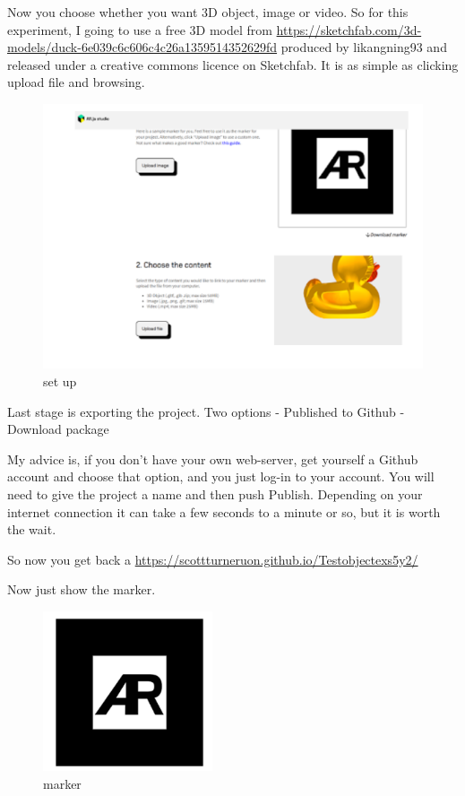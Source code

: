Now you choose whether you want 3D object, image or video. So for this experiment, I going to use a free 3D model from \url{https://sketchfab.com/3d-models/duck-6e039c6c606c4c26a1359514352629fd} produced by likangning93 and released under a creative commons licence on Sketchfab. It is as simple as clicking upload file and browsing.

\begin{figure}
    \centering
    \includegraphics{chapters/ChapterAR/webar5.png}
    \caption{set up}
    \label{fig:my_setup}
\end{figure}

Last stage is exporting the project. Two options 
- Published to Github 
- Download package

My advice is, if you don't have your own web-server, get yourself a Github account and choose that option, and you just log-in to your account. You will need to give the project a name and then push Publish. Depending on your internet connection it can take a few seconds to a minute or so, but it is worth the wait.

So now you get back a \url{https://scottturneruon.github.io/Testobjectexs5y2/} 

Now just show the marker.
\begin{figure}
    \centering
    \includegraphics[width=5cm]{chapters/ChapterAR/webar6.png}
    \caption{marker}
    \label{fig:marker}
\end{figure}

